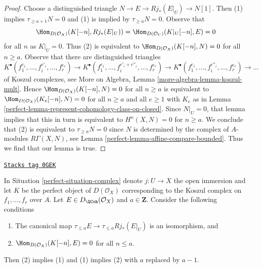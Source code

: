 \begin{proof}

Choose a distinguished triangle $N \to E \to Rj_*(E|_U) \to N[1]$.
Then (1) implies $\tau_{\geq a + 1} N = 0$ and (1) is implied by
$\tau_{\geq a}N = 0$. Observe that
$$
\Hom_{D(\mathcal{O}_X)}(K[-n], Rj_*(E|_U)) =
\Hom_{D(\mathcal{O}_U)}(K|_U[-n], E) = 0
$$
for all $n$ as $K|_U = 0$. Thus (2) is equivalent to
$\Hom_{D(\mathcal{O}_X)}(K[-n], N) = 0$ for all $n \geq a$.
Observe that there are distinguished triangles
$$
K^\bullet(f_1^{e_1}, \ldots, f_i^{e'_i}, \ldots, f_r^{e_r}) \to
K^\bullet(f_1^{e_1}, \ldots, f_i^{e'_i + e''_i}, \ldots, f_r^{e_r}) \to
K^\bullet(f_1^{e_1}, \ldots, f_i^{e''_i}, \ldots, f_r^{e_r}) \to \ldots
$$
of Koszul complexes, see
More on Algebra, Lemma \ref{more-algebra-lemma-koszul-mult}. Hence
$\Hom_{D(\mathcal{O}_X)}(K[-n], N) = 0$ for all $n \geq a$
is equivalent to
$\Hom_{D(\mathcal{O}_X)}(K_e[-n], N) = 0$ for all $n \geq a$ and
all $e \geq 1$ with $K_e$ as in
Lemma \ref{perfect-lemma-represent-cohomology-class-on-closed}.
Since $N|_U = 0$, that lemma implies that this in turn is equivalent to
$H^n(X, N) = 0$ for $n \geq a$. We conclude that (2) is equivalent
to $\tau_{\geq a}N = 0$ since $N$ is determined by the complex of
$A$-modules $R\Gamma(X, N)$, see Lemma \ref{perfect-lemma-affine-compare-bounded}.
Thus we find that our lemma is true.
\end{proof}

\begin{lemma}
\label{perfect-lemma-orthogonal-koszul-second-variant}
\href{https://stacks.math.columbia.edu/tag/0GEK}{\texttt{Stacks tag 0GEK}}

In Situation \ref{perfect-situation-complex} denote $j : U \to X$ the open
immersion and let $K$ be the perfect object of $D(\mathcal{O}_X)$
corresponding to the Koszul complex on $f_1, \ldots, f_r$ over $A$.
Let $E \in D_\QCoh(\mathcal{O}_X)$ and $a \in \mathbf{Z}$. Consider
the following conditions
\begin{enumerate}
\item The canonical map $\tau_{\leq a}E \to \tau_{\leq a} Rj_*(E|_U)$
is an isomorphism, and
\item $\Hom_{D(\mathcal{O}_X)}(K[-n], E) = 0$ for all $n \leq a$.
\end{enumerate}
Then (2) implies (1) and (1) implies (2) with $a$ replaced by $a - 1$.
\end{lemma}

